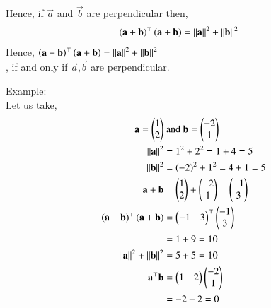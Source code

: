 \documentclass[journal,12pt,twocolumn]{IEEEtran}
\renewcommand\thesection{\arabic{section}}
\begin{document}
\begin{enumerate}
	Hence, if $\vec{a}$ and $\vec{b}$ are perpendicular then,
	\begin{align}
		\left(\mathbf{a}+\mathbf{b}\right)^{\top}\left(\mathbf{a}+\mathbf{b}\right) &= \left\lVert\mathbf{a}\right\rVert^2+\left\lVert\mathbf{b}\right\rVert^2
	\end{align}
	Hence, $\left(\mathbf{a}+\mathbf{b}\right)^{\top}\left(\mathbf{a}+\mathbf{b}\right)=\left\lVert\mathbf{a}\right\rVert^2+\left\lVert\mathbf{b}\right\rVert^2$\\, if and only if $\vec{a}$,$\vec{b}$ are perpendicular.

	Example:\\
	Let us take,
	\begin{align}
		\mathbf{a} = \begin{pmatrix}1\\2\end{pmatrix} & \text{ and } \mathbf{b} = \begin{pmatrix}-2\\1\end{pmatrix}\\
		\left\lVert\mathbf{a}\right\rVert^2 &= 1^2+2^2 = 1+4 = 5\\
		\left\lVert\mathbf{b}\right\rVert^2 &= \left(-2\right)^2+1^2= 4+1 = 5\\
		\mathbf{a}+\mathbf{b} &= \begin{pmatrix}1\\2\end{pmatrix}+\begin{pmatrix}-2\\1\end{pmatrix} = \begin{pmatrix}-1\\3\end{pmatrix}\\
		\left(\mathbf{a}+\mathbf{b}\right)^{\top}\left(\mathbf{a}+\mathbf{b}\right)&=\begin{pmatrix}-1&3\end{pmatrix}^{\top}\begin{pmatrix}-1\\3\end{pmatrix}\\ 
								   &=1+9 = 10\\
		\left\lVert\mathbf{a}\right\rVert^2+\left\lVert\mathbf{b}\right\rVert^2&=5+5=10\\
		\mathbf{a}^{\top}\mathbf{b}&=\begin{pmatrix}1&2\end{pmatrix}\begin{pmatrix}-2\\1\end{pmatrix}\\
				     &=-2+2=0
	\end{align}
\end{enumerate}

%
\end{document}
